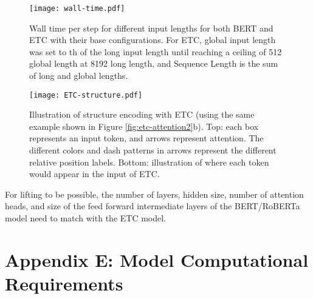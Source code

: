 \documentclass[11pt,a4paper]{article}
\begin{document}
\begin{table}[tb]\centering
{}
\caption{Time taken for fine-tuning the baseline ETC (base) model on different datasets, together with the hardware configuration used (2 cores = 1 chip). As we did a hyper-parameter sweep with different number of epochs, we report the time of the largest number of epochs we tried.}
\label{tbl:times-ft} 
\end{table}

\begin{figure}[t!]
	\texttt{[image: wall-time.pdf]}
	\centering
	\caption{Wall time per step for different input lengths for both BERT and ETC with their base configurations. For ETC, global input length was set to th of the long input length until reaching a ceiling of 512 global length at 8192 long length, and Sequence Length is the sum of long and global lengths.}
	\label{fig:walltime}
\end{figure}

\begin{figure}[tb]
\texttt{[image: ETC-structure.pdf]}
	\centering
	\caption{Illustration of structure encoding with ETC (using the same example shown in Figure \ref{fig:etc-attention2}b).
	Top: each box represents an input token, and arrows represent attention. The different colors and dash patterns in arrows represent the different relative position labels. Bottom: illustration of where each token would appear in the input of ETC.}
	\label{fig:etc-structure}
\end{figure}

For lifting to be possible, the number of layers, hidden size, number of attention heads, and size of the feed forward intermediate layers of the BERT/RoBERTa model need to match with the ETC model.


\section*{Appendix E: Model Computational Requirements}\label{app:parameters}
\end{document}
